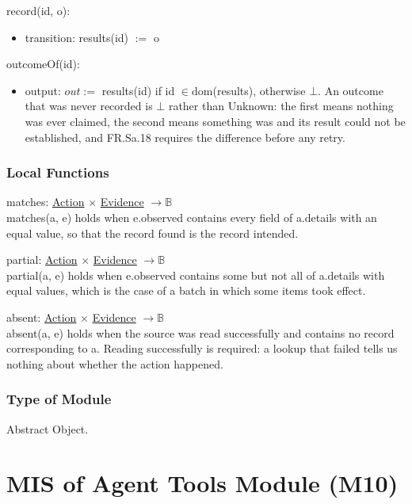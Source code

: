 \documentclass[12pt, titlepage]{article}
\newcommand{\B}{\mathbb{B}}
\newcommand{\nil}{\bot}
\begin{document}
\noindent record(id, o):
\begin{itemize}
\item transition: results(id) $:=$ o
\end{itemize}

\noindent outcomeOf(id):
\begin{itemize}
\item output: $out :=$ results(id) if id $\in \mathrm{dom}$(results), otherwise
$\nil$. An outcome that was never recorded is $\nil$ rather than Unknown: the
first means nothing was ever claimed, the second means something was and its
result could not be established, and FR.Sa.18 requires the difference before any
retry.
\end{itemize}

\subsubsection{Local Functions}

\noindent matches: \hyperref[type:Action]{Action} $\times$
\hyperref[type:Evidence]{Evidence} $\to \B$\\
matches(a, e) holds when e.observed contains every field of a.details with an
equal value, so that the record found is the record intended.

\noindent partial: \hyperref[type:Action]{Action} $\times$
\hyperref[type:Evidence]{Evidence} $\to \B$\\
partial(a, e) holds when e.observed contains some but not all of a.details with
equal values, which is the case of a batch in which some items took effect.

\noindent absent: \hyperref[type:Action]{Action} $\times$
\hyperref[type:Evidence]{Evidence} $\to \B$\\
absent(a, e) holds when the source was read successfully and contains no record
corresponding to a. Reading successfully is required: a lookup that failed tells
us nothing about whether the action happened.

\subsubsection{Type of Module}

Abstract Object.

\newpage

\section{MIS of Agent Tools Module (M10)} \label{mod:tools}
\end{document}

